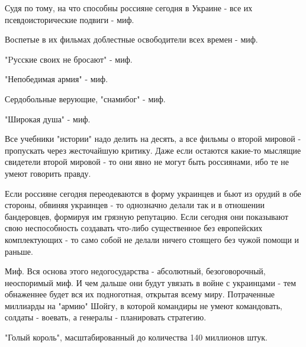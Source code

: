  
 
 
 
 

Судя по тому, на что способны россияне сегодня в Украине - все их
псевдоисторические подвиги - миф.

Воспетые в их фильмах доблестные освободители всех времен - миф.

"Pусские своих не бросают" - миф.

"Непобедимая армия" - миф.

Сердобольные верующие, "снамибог" - миф.

"Широкая душа" - миф.

Все учебники "истории" надо делить на десять, а все фильмы о второй мировой -
пропускать через жесточайшую критику. Даже если остаются какие-то мыслящие
свидетели второй мировой - то они явно не могут быть россиянами, ибо те не
умеют говорить правду.

Если россияне сегодня переодеваются в форму украинцев и бьют из орудий в обе
стороны, обвиняя украинцев - то однозначно делали так и в отношении
бандеровцев, формируя им грязную репутацию. Если сегодня они показывают свою
неспособность создавать что-либо существенное без европейских комплектующих -
то само собой не делали ничего стоящего без чужой помощи и раньше.

Миф. Вся основа этого недогосударства - абсолютный, безоговорочный, неоспоримый
миф. И чем дальше они будут увязать в войне с украинцами - тем обнаженнее будет
вся их подноготная, открытая всему миру. Потраченные миллиарды на "армию"
Шойгу, в которой командиры не умеют командовать, солдаты - воевать, а генералы
- планировать стратегию.

"Голый король", масштабированный до количества 140 миллионов штук.
